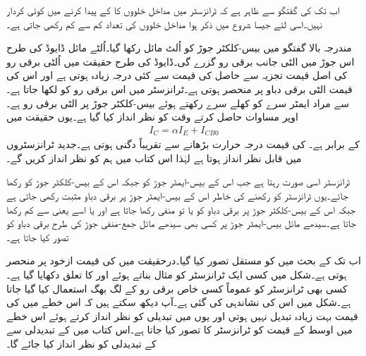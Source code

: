 اب تک کی گفتگو سے ظاہر ہے کہ  ٹرانزسٹر میں مداخل خلووں کا   کے پیدا کرنے میں کوئی کردار نہیں۔اسی لئے جیسا شروع میں ذکر ہوا مداخل خلووں کی تعداد کم سے کم رکھی جاتی ہے۔

مندرجہ بالا گفتگو میں بیس-کلکٹر جوڑ کو اُلٹ مائل رکھا گیا۔اُلٹے مائل ڈایوڈ کی طرح اس جوڑ میں الٹی جانب برقی رو  گزرے گی۔ڈایوڈ کی طرح حقیقت میں اُلٹی برقی رو کی اصل قیمت تجزیہ سے حاصل  کی قیمت سے کئی درجہ زیادہ ہوتی ہے اور اس کی قیمت الٹی برقی دباو پر منحصر ہوتی ہے۔ٹرانزسٹر میں اس برقی رو کو  لکھا جاتا ہے۔  سے مراد ایمٹر سرے کو کھلے سرے رکھتے ہوئے بیس-کلکٹر جوڑ پر الٹی برقی رو ہے۔اوپر مساوات حاصل کرتے وقت   کو نظر انداز کیا گیا ہے۔یوں حقیقت میں
\begin{align}
I_C=\alpha I_E+I_{CB0}
\end{align}
کے برابر ہے۔ کی قیمت درجہ حرارت  بڑھانے سے تقریباً دگنی ہوتی ہے۔جدید ٹرانزسٹروں میں  قابل نظر انداز ہوتا ہے لہٰذا اس کتاب میں ہم  کو نظر انداز کریں گے۔

 ٹرانزسٹر اسی صورت   رہتا ہے جب اس کے بیس-ایمٹر  جوڑ کو  جبکہ اس کے بیس-کلکٹر جوڑ کو  رکھا جائے۔یوں ٹرانزسٹر کو  رکھنے کی خاطر اس کے  بیس-ایمٹر جوڑ پر برقی دباو  مثبت رکھی جاتی ہے جبکہ اس کے بیس-کلکٹر جوڑ پر برقی دباو  کو یا تو منفی رکھا جاتا ہے اور یا اسے  یعنی  سے کم رکھا جاتا ہے۔سیدھے مائل بیس-ایمٹر  جوڑ پر کسی بھی سیدھے مائل جمع-منفی جوڑ کی طرح برقی دباو کو  تصور کیا جاتا ہے۔


اب تک کے بحث میں  کو مستقل تصور کیا گیا۔درحقیقت میں  کی قیمت ازخود  پر منحصر ہوتی ہے۔شکل  میں کسی ایک ٹرانزسٹر کو مثال بناتے ہوئے   اور  کا تعلق دکھایا گیا ہے۔کسی بھی ٹرانزسٹر کو عموماً کسی خاص برقی رو کے لگ بھگ استعمال کیا گیا جاتا ہے۔شکل میں اس کی نشاندہی کی گئی ہے۔آپ دیکھ سکتے ہیں کہ اس خطے میں  کی قیمت بہت زیادہ  تبدیل نہیں ہوتی اور یوں  میں تبدیلی کو نظر انداز کرتے ہوئے  اس خطے میں  اوسط  کے قیمت کو ٹرانزسٹر کا  تصور کیا جاتا  ہے۔اس کتاب میں  کے تبدیدلی سے   کے تبدیدلی کو نظر انداز کیا جائے گا۔ 


